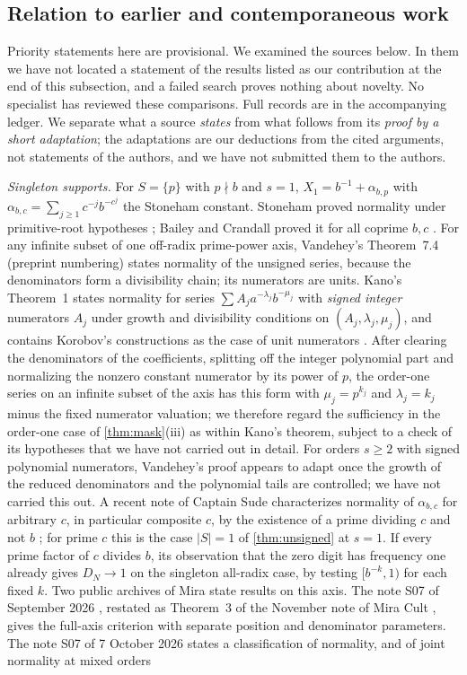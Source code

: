 \documentclass[11pt]{article}
\begin{document}
\subsection{Relation to earlier and contemporaneous work}\label{sec:related}
Priority statements here are provisional. We examined the sources below. In them we have not located a statement of the results listed as our contribution at the end of this subsection, and a failed search proves nothing about novelty. No specialist has reviewed these comparisons. Full records are in the accompanying ledger. We separate what a source \emph{states} from what follows from its \emph{proof by a short adaptation}; the adaptations are our deductions from the cited arguments, not statements of the authors, and we have not submitted them to the authors.

\emph{Singleton supports.} For $S=\{p\}$ with $p\nmid b$ and $s=1$, $X_1=b^{-1}+\alpha_{b,p}$ with $\alpha_{b,c}=\sum_{j\ge1}c^{-j}b^{-c^j}$ the Stoneham constant. Stoneham proved normality under primitive-root hypotheses \cite{stoneham}; Bailey and Crandall proved it for all coprime $b,c$ \cite[Corollary~4.9(i)]{bc}. For any infinite subset of one off-radix prime-power axis, Vandehey's Theorem~7.4 \cite{vandehey} (preprint numbering) states normality of the unsigned series, because the denominators form a divisibility chain; its numerators are units. Kano's Theorem~1 \cite[p.~911]{kano} states normality for series $\sum A_ja^{-\lambda_j}b^{-\mu_j}$ with \emph{signed integer} numerators $A_j$ under growth and divisibility conditions on $(A_j,\lambda_j,\mu_j)$, and contains Korobov's constructions as the case of unit numerators \cite{korobov}. After clearing the denominators of the coefficients, splitting off the integer polynomial part and normalizing the nonzero constant numerator by its power of $p$, the order-one series on an infinite subset of the axis has this form with $\mu_j=p^{k_j}$ and $\lambda_j=k_j$ minus the fixed numerator valuation; we therefore regard the sufficiency in the order-one case of \cref{thm:mask}(iii) as within Kano's theorem, subject to a check of its hypotheses that we have not carried out in detail. For orders $s\ge2$ with signed polynomial numerators, Vandehey's proof appears to adapt once the growth of the reduced denominators and the polynomial tails are controlled; we have not carried this out. A recent note of Captain Sude characterizes normality of $\alpha_{b,c}$ for arbitrary $c$, in particular composite $c$, by the existence of a prime dividing $c$ and not $b$ \cite{sudeprime}; for prime $c$ this is the case $|S|=1$ of \cref{thm:unsigned} at $s=1$. If every prime factor of $c$ divides $b$, its observation that the zero digit has frequency one already gives $D_N\to1$ on the singleton all-radix case, by testing $[b^{-k},1)$ for each fixed $k$. Two public archives of Mira state results on this axis. The note S07 of September 2026 \cite[S07, T29]{mira}, restated as Theorem~3 of the November note of Mira Cult \cite{miracult}, gives the full-axis criterion with separate position and denominator parameters. The note S07 of 7 October 2026 \cite[Theorems~1.1, 1.2 and 9.1, as summarized in its result list]{mirabis} states a classification of normality, and of joint normality at mixed orders 
\end{document}
